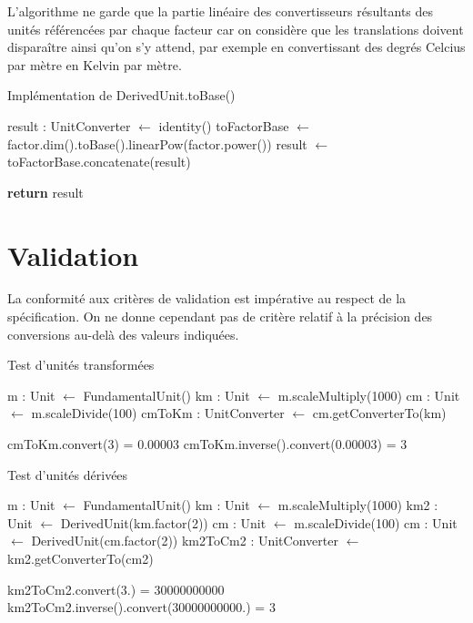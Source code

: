 \documentclass[a4paper,twoside,10pt]{article}
\begin{document}
L'algorithme ne garde que la partie linéaire des convertisseurs résultants des unités référencées par chaque facteur car
on considère que les translations doivent disparaître ainsi qu'on s'y attend, par exemple en convertissant des degrés
Celcius par mètre en Kelvin par mètre.

\begin{algorithm}[!h]
\caption{Implémentation de DerivedUnit.toBase()}\label{derivedToBase}
\begin{algorithmic}

\State result : UnitConverter $\gets$ identity()
\State toFactorBase $\gets$ factor.dim().toBase().linearPow(factor.power())
\State result $\gets$ toFactorBase.concatenate(result)
\EndFor

\State \textbf{return} result
\EndProcedure
\end{algorithmic}
\end{algorithm}

\section{Validation}

La conformité aux critères de validation est impérative au respect de la spécification. On ne donne cependant pas de
critère relatif à la précision des conversions au-delà des valeurs indiquées.


\begin{algorithm}[!h]
\caption{Test d'unités transformées}\label{transformedTest}
\begin{algorithmic}

\State m : Unit $\gets$ FundamentalUnit()
\State km : Unit $\gets$ m.scaleMultiply(1000)
\State cm : Unit $\gets$ m.scaleDivide(100)
\State cmToKm : UnitConverter $\gets$ cm.getConverterTo(km)

\Require cmToKm.convert(3) = 0.00003
\Require cmToKm.inverse().convert(0.00003) = 3
\EndProcedure
\end{algorithmic}
\end{algorithm}

\begin{algorithm}[!h]
\caption{Test d'unités dérivées}\label{derivedTest}
\begin{algorithmic}

\State m : Unit $\gets$ FundamentalUnit()
\State km : Unit $\gets$ m.scaleMultiply(1000)
\State km2 : Unit $\gets$ DerivedUnit(km.factor(2))
\State cm : Unit $\gets$ m.scaleDivide(100)
\State cm : Unit $\gets$ DerivedUnit(cm.factor(2))
\State km2ToCm2 : UnitConverter $\gets$ km2.getConverterTo(cm2)

\Require km2ToCm2.convert(3.) = 30000000000
\Require km2ToCm2.inverse().convert(30000000000.) = 3
\EndProcedure
\end{algorithmic}
\end{algorithm}
\end{document}
